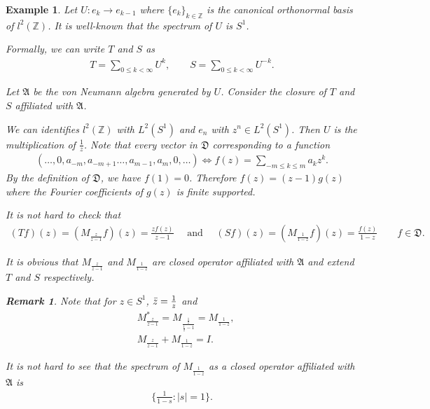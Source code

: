 \documentclass[a4paper,10pt]{amsart}
\newtheorem{example}{Example}[section]
\newtheorem{remark}{Remark}[section]
\newcommand{\AAA}{\mathfrak A}
\newcommand{\DDD}{\mathfrak D}
\newcommand{\Z}{\mathbb Z} %
\begin{document}
\begin{example}

Let $U: e_{k} \to e_{k-1}$ where $\{e_{k}\}_{k \in \Z }$ is the canonical 
orthonormal basis of $l^{2}(\Z)$. It is well-known that the 
spectrum of $U$ is $S^{1}$.

Formally, we can write $T$ and $S$ as 
\begin{align*}
    T = \sum_{0 \leq k < \infty}U^{k}, \qquad 
    S = \sum_{0 \leq k < \infty}U^{-k}.
\end{align*}

Let $\AAA$ be the von Neumann algebra generated by $U$. Consider
the closure of $T$ and $S$ affiliated with $\AAA$. 


We can identifies $l^{2}(\Z)$ with $L^{2}(S^{1})$ and 
$e_n$ with $z^{n} \in L^{2}(S^{1})$. Then $U$ is the multiplication of 
$\frac{1}{z}$. Note that every vector in $\DDD$ corresponding to a 
function 
\begin{align*}
    (\ldots, 0, a_{-m}, a_{-m+1} \ldots, a_{m-1}, a_{m}, 0, \ldots) 
    \Longleftrightarrow f(z) = \sum_{-m \leq k \leq m}a_k z^{k}.
\end{align*}
By the definition of $\DDD$, we have $f(1) = 0$. Therefore
$f(z) = (z-1)g(z)$ where the Fourier coefficients of $g(z)$ is 
finite supported. 

It is not hard to check that
\begin{align*}
    (Tf)(z) = (M_{\frac{z}{z-1}}f)(z) = 
    \frac{zf(z)}{z-1} \quad \mbox{ and } \quad 
    (Sf)(z) =(M_{\frac{1}{1-z}}f)(z) = \frac{f(z)}{1-z} 
    \qquad f \in \DDD.   
\end{align*}

It is obvious that $M_{\frac{z}{z-1}}$ and $M_{\frac{1}{1-z}}$ are
closed operator affiliated with $\AAA$ and extend $T$ and $S$ respectively.

\begin{remark}
    Note that for $z \in S^1$, $\Bar{z} = \frac{1}{z}$ and
   \begin{align*}
       &M_{\frac{z}{z-1}}^* = M_{\frac{\frac{1}{z}}{\frac{1}{z}-1}} = 
       M_{\frac{1}{1-z}}, \\
       &M_{\frac{z}{z-1}} + M_{\frac{1}{1-z}} = I. 
    \end{align*}
\end{remark}

It is not hard to see that the spectrum of $M_{\frac{1}{1-z}}$ as 
a closed operator affiliated with $\AAA$ is 
\begin{align*}
    \{\frac{1}{1-s} : |s| = 1\}. 
\end{align*}


\end{example}
\end{document}

